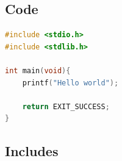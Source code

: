 \documentclass{article}
\begin{document}
\subsection{Code}

\begin{lstlisting}[language=C]
#include <stdio.h>
#include <stdlib.h>

int main(void){
	printf("Hello world");

	return EXIT_SUCCESS;
}
\end{lstlisting}

\subsection{Includes}



\end{document}
